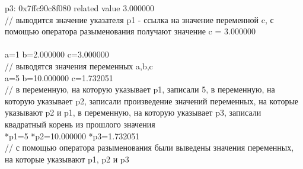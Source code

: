 \documentclass[a4paper,14pt]{extarticle}
\begin{document}
p3: 0x7ffc90c8f080 related value 3.000000\\
// выводится значение указателя p1 - ссылка на значение переменной c, с помощью оператора разыменования получают значение c = 3.000000\\
\\
a=1	b=2.000000	c=3.000000\\
// выводятся значения переменных a,b,c\\
a=5	b=10.000000	c=1.732051\\
// в переменную, на которую указывает p1, записали 5, в переменную, на которую указывает p2, записали произведение значений переменных, на которые указывают p2 и p1, в переменную, на которую указывает p3, записали квадратный корень из прошлого значения\\
*p1=5	*p2=10.000000	*p3=1.732051\\
// с помощью оператора разыменования были выведены значения переменных, на которые указывают p1, p2 и p3\\
\end{document}
